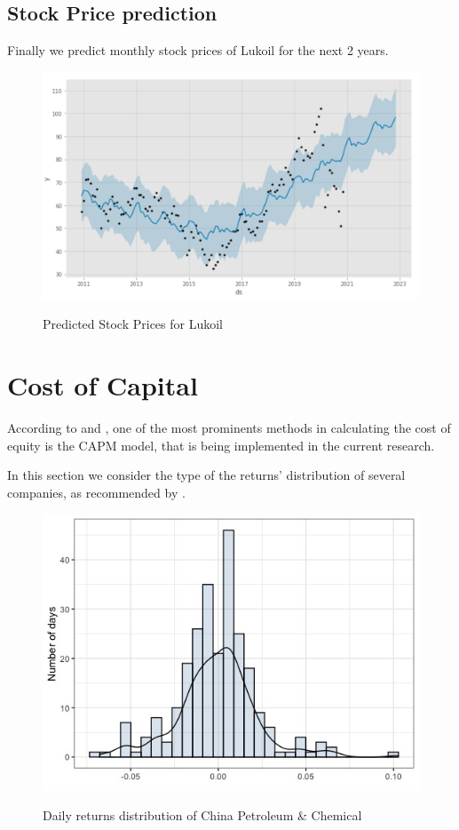 \documentclass [a4paper, 11pt] {article}
\begin{document}
\subsection {Stock Price prediction}
Finally we predict monthly stock prices of Lukoil for the next 2 years.

\begin{figure}[h]
\caption{Predicted Stock Prices for Lukoil}
\includegraphics[scale=0.85]{Predicted}
\label{fig:graph}
\end{figure}
\clearpage

\section {Cost of Capital}
According to \cite{DamodaranDark} and \cite{BestPract}, one of the most prominents methods in calculating the cost of equity is the CAPM model, that is being implemented in the current research.

In this section we consider the type of the returns' distribution of several companies, as recommended by \cite{Fishman}.

\begin{figure}[h]
\caption{Daily returns distribution of China Petroleum \& Chemical}
\includegraphics[scale=0.65]{snp_hist}
\label{fig:hist1}
\end{figure}
\end{document}
